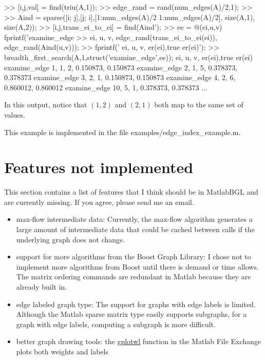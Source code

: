 \documentclass[12pt]{article}
\newcommand{\mycmd}[1]{\url{#1}}
\newcommand{\mypath}[1]{{\ttfamily \small #1}}
\begin{document}
\begin{mcode}
>> [i,j,val] = find(triu(A,1));
>> edge_rand = rand(num_edges(A)/2,1);
>> %
>> Aind = sparse([i; j],[j; i],[1:num_edges(A)/2 1:num_edges(A)/2], size(A,1), size(A,2));
>> [i,j,trans_ei_to_ei] = find(Aind');
>> ee = @(ei,u,v) fprintf('examine_edge   %
>>     ei, u, v, edge_rand(trans_ei_to_ei(ei)), edge_rand(Aind(u,v)));
>> fprintf('               ei,   u,   v,     er(ei),true er(ei)\n');
>> breadth_first_search(A,1,struct('examine_edge',ee));
               ei,   u,   v,     er(ei),true er(ei)
examine_edge    1,   1,   2,   0.150873,   0.150873
examine_edge    2,   1,   5,   0.378373,   0.378373
examine_edge    3,   2,   1,   0.150873,   0.150873
examine_edge    4,   2,   6,   0.860012,   0.860012
examine_edge   10,   5,   1,   0.378373,   0.378373
...
\end{mcode}
In this output, notice that $(1,2)$ and $(2,1)$ both map to the same set of values.  




 This example is implemented in the file \mypath{examples/edge\_index\_example.m}.
 
\section{Features not implemented}

This section contains a list of features that I think should be in MatlabBGL and are currently missing.  If you agree, please send me an email.

\begin{itemize}
\item max-flow intermediate data: Currently, the max-flow algorithm generates a large amount of intermediate data that could be cached between calls if the underlying graph does not change.  
\item support for more algorithms from the Boost Graph Library: I chose not to implement more algorithms from Boost until there is demand or time allows.  The matrix ordering commands are redundant in Matlab because they are already built in.
\item edge labeled graph type: The support for graphs with edge labels is limited.  Although the Matlab sparse matrix type easily supports subgraphs, for a graph with edge labels, computing a subgraph is more difficult.  
\item better graph drawing tools: the \mycmd{gplotwl} function in the Matlab File Exchange plots both weights and labels 
\end{itemize}
\end{document}
